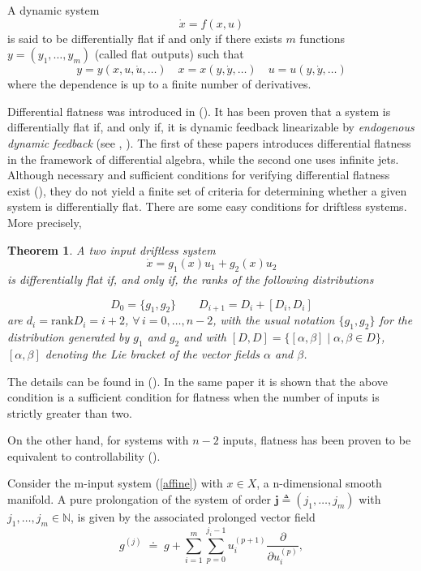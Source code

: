 \documentclass[10pt]{article}
\newcommand{\N}{\mathbb N}
\newcommand{\3}{\mathbf{3}}
\newcommand{\2}{\mathbf{2}}
\newcommand{\1}{\mathbf{1}}
\newcommand{\0}{\mathbf{0}}
\newcommand{\mbf}[1]{\mathbf{#1}}
\newcommand{\rk}{\mathrm{rank}}
\newtheorem{thm}{Theorem}
\begin{document}
A dynamic system
\[ \dot{x}=f(x,u)  \]
is said to be differentially flat if and only if there exists $m$ functions $y=(y_1,\dots,y_m)$ (called flat outputs) such that
\begin{equation}\label{flatout:def} y=y(x,u,\dot{u},\dots) \quad x=x(y,\dot{y},\dots) \quad u=u(y,\dot{y},\dots) \end{equation}
where the dependence is up to a finite number of derivatives.

Differential flatness was introduced in (\cite{FLMR1995}). It has been proven that a system is differentially flat if, and only if, it is dynamic feedback linearizable by \emph{endogenous dynamic feedback} (see \cite{FLMR1995}, \cite{FLMR1999}). The first of these papers introduces differential flatness in the framework of differential algebra, while the second one uses infinite jets. Although necessary and sufficient conditions for verifying differential flatness exist (\cite{Levine2011}), they do not yield a finite set of criteria for determining whether a given system is differentially flat. There are some easy conditions for driftless systems. More precisely,

\begin{thm}
\label{theoremMR}
A two input driftless system
\begin{equation} \dot{x}=g_1(x)u_1+g_2(x)u_2  \label{2input} \end{equation}
is differentially flat if, and only if, the ranks of the following distributions

\[ D_0= \{g_1,g_2\} \qquad D_{i+1}=D_i+ [D_i,D_i] \]
are $d_i=\rk D_i=i+2$, $\forall \, i=0,\dots,n-2$, with the usual notation $\{g_1,g_2\}$ for the distribution generated by $g_1$ and $g_2$  and with $[D,D]  =  \{ [\alpha, \beta] \mid \alpha, \beta \in D\}$, $[\alpha, \beta]$ denoting the Lie bracket of the vector fields $\alpha$ and $\beta$.
\end{thm}

The details can be found in (\cite{MR94}). In the same paper it is shown that the above condition is a sufficient condition for flatness when the number of inputs is strictly greater than two.

On the other hand, for systems with $n-2$ inputs, flatness has been proven to be equivalent to controllability (\cite{MR95}).

Consider the m-input system (\ref{affine}) with $x \in X$,  a n-dimensional smooth manifold. A pure prolongation of the system of order $\mbf{j}\triangleq (j_{1}, \ldots, j_{m})$ with $j_{1}, \ldots, j_{m} \in \N$, is given by
the associated prolonged vector field
\[
g^{(j)} \;\doteq\; g
+ \sum_{i=1}^{m} \sum_{p=0}^{j_i-1} u_i^{(p+1)} \frac{\partial}{\partial u_i^{(p)}},
\]
\end{document}
